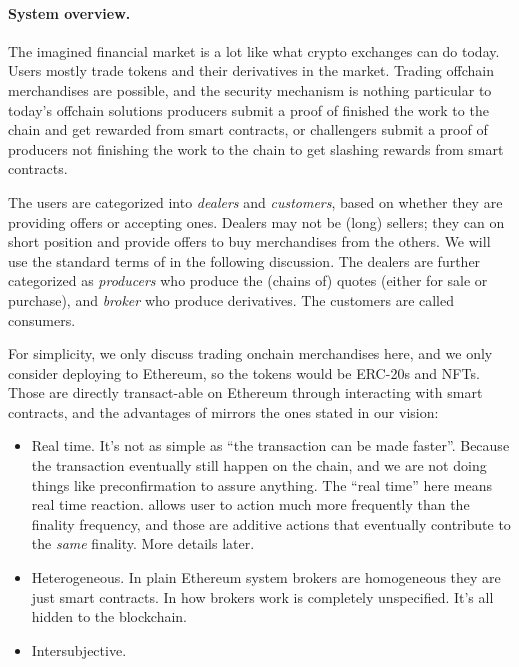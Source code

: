 \paragraph{System overview.}
The imagined financial market is a lot like what crypto exchanges can do today.
Users mostly trade tokens and their derivatives in the market.
Trading offchain merchandises are possible, and the security mechanism is nothing particular to today's offchain solutions \eg producers submit a proof of finished the work to the chain and get rewarded from smart contracts, or challengers submit a proof of producers not finishing the work to the chain to get slashing rewards from smart contracts.

The users are categorized into \emph{dealers} and \emph{customers}, based on whether they are providing offers or accepting ones.
Dealers may not be (long) sellers; they can on short position and provide offers to buy merchandises from the others.
We will use the standard terms of \sys in the following discussion.
The dealers are further categorized as \emph{producers} who produce the (chains of) quotes (either for sale or purchase), and \emph{broker} who produce derivatives.
The customers are called consumers.

For simplicity, we only discuss trading onchain merchandises here, and we only consider deploying to Ethereum, so the tokens would be ERC-20s and NFTs.
Those are directly transact-able on Ethereum through interacting with smart contracts, and the advantages of \sys mirrors the ones stated in our vision:
\begin{itemize}
    \item Real time. 
    It's not as simple as ``the transaction can be made faster''.
    Because the transaction eventually still happen on the chain, and we are not doing things like preconfirmation to assure anything.
    The ``real time'' here means real time reaction.
    \sys allows user to action much more frequently than the finality frequency, and those are additive actions that eventually contribute to the \emph{same} finality.
    More details later.
    \item Heterogeneous.
    In plain Ethereum system brokers are homogeneous \ie they are just smart contracts.
    In \sys how brokers work is completely unspecified.
    It's all hidden to the blockchain.
    \item Intersubjective.
\end{itemize}

